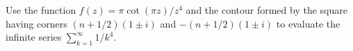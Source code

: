 Use the function $f(z)=\pi\cot(\pi z)/z^4$ and the contour formed by
the square having corners $(n+1/2)(1\pm i)$ and $-(n+1/2)(1\pm i)$
to evaluate the infinite series $\sum_{k=1}^{\infty}1/k^4$.
